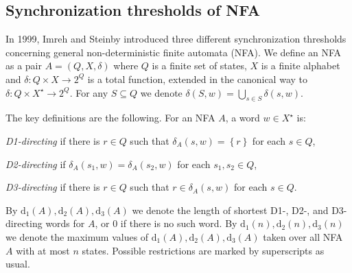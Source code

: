 \documentclass{ws-ijmpc}
\begin{document}
\subsection{Synchronization thresholds of NFA\label{sub:PFAvsNFA}}

In 1999, Imreh and Steinby \citep{IMR2} introduced three different
synchronization thresholds concerning general non-deterministic finite
automata (NFA). We define an NFA as a pair $A=\left(Q,X,\delta\right)$
where $Q$ is a finite set of states, $X$ is a finite alphabet and
$\delta:Q\times X\rightarrow2^{Q}$ is a total function, extended
in the canonical way to $\delta:Q\times X^{\star}\rightarrow2^{Q}$.
For any $S\subseteq Q$ we denote $\delta\!\left(S,w\right)=\bigcup_{s\in S}\delta\!\left(s,w\right)$.

The key definitions are the following. For an NFA $A$, a word $w\in X^{\star}$
is:
\begin{itemlist}
\item \emph{D1-directing} if there is $r\in Q$ such that $\delta_{A}\!\left(s,w\right)=\left\{ r\right\} $
for each $s\in Q$,
\item \emph{D2-directing }if $\delta_{A}\!\left(s_{1},w\right)=\delta_{A}\!\left(s_{2},w\right)$
for each $s_{1},s_{2}\in Q$,
\item \emph{D3-directing }if there is $r\in Q$ such that $r\in\delta_{A}\!\left(s,w\right)$
for each $s\in Q$.
\end{itemlist}
By $\mathrm{d_{1}}\!\left(A\right),\mathrm{d_{2}}\!\left(A\right),\mathrm{d_{3}}\!\left(A\right)$
we denote the length of shortest D1-, D2-, and D3-directing words
for $A$, or $0$ if there is no such word. By $\mathrm{d_{1}}\!\left(n\right),\mathrm{d_{2}}\!\left(n\right),\mathrm{d_{3}}\!\left(n\right)$
we denote the maximum values of $\mathrm{d_{1}}\!\left(A\right),\mathrm{d_{2}}\!\left(A\right),\mathrm{d_{3}}\!\left(A\right)$
taken over all NFA $A$ with at most $n$ states. Possible restrictions
are marked by superscripts as usual.
\end{document}
